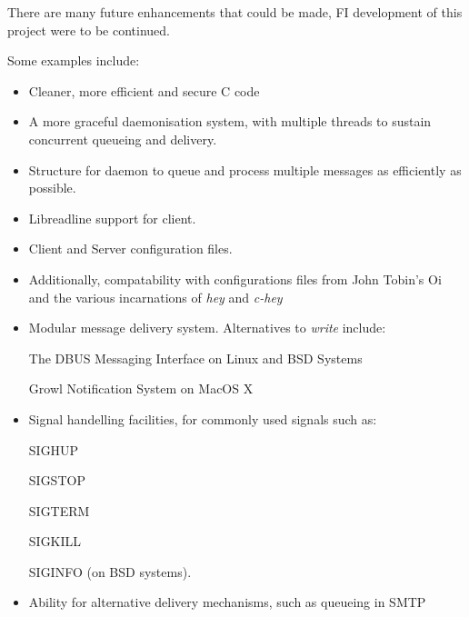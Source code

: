 There are many future enhancements that could be made, FI development of
this project were to be continued.

Some examples include:

\begin{itemize}

\item Cleaner, more efficient and secure C code

\item A more graceful daemonisation system, with multiple threads to
sustain concurrent queueing and delivery.

\item Structure for daemon to queue and process multiple messages as
efficiently as possible. 

\item Libreadline support for client.

\item Client and Server configuration files.

	\item Additionally, compatability with configurations files from John
	Tobin's Oi and the various incarnations of \emph{hey} and 
	\emph{c-hey}

\item Modular message delivery system. Alternatives to \emph{write} 
include:

	\subitem The DBUS Messaging Interface on Linux and BSD Systems

	\subitem Growl Notification System on MacOS X

\item Signal handelling facilities, for commonly used signals such as:
	
	\subitem SIGHUP 
	
	\subitem SIGSTOP

	\subitem SIGTERM

	\subitem SIGKILL 

	\subitem SIGINFO (on BSD systems).

\item Ability for alternative delivery mechanisms, such as queueing in
SMTP

\end{itemize}
